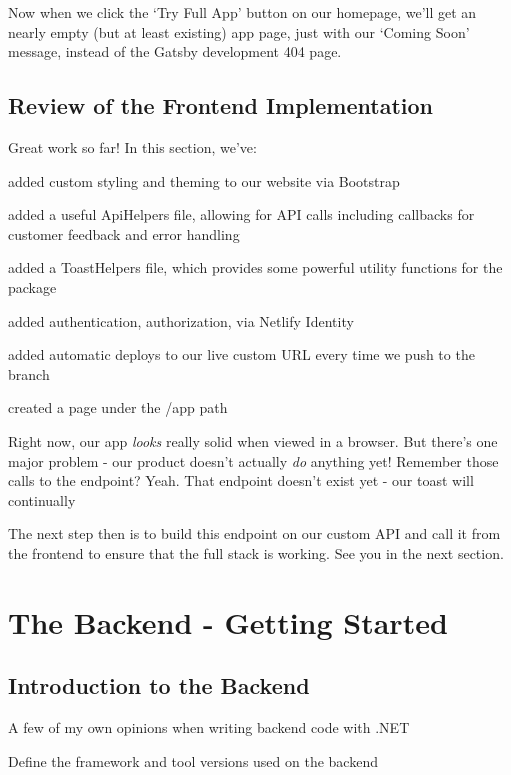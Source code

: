 \documentclass[paper=6in:9in,pagesize=pdftex,headinclude=on,footinclude=on,12pt]{scrbook}
\begin{document}
Now when we click the `Try Full App' button on our homepage, we'll get an nearly empty (but at least existing) app page, just with our `Coming Soon' message, instead of the Gatsby development 404 page.

\section{Review of the Frontend Implementation}

Great work so far! In this section, we've: 

\begin{arrows}
\item added custom styling and theming to our website via Bootstrap
\item added a useful ApiHelpers file, allowing for API calls including callbacks for customer feedback and error handling
\item added a ToastHelpers file, which provides some powerful utility functions for the  package
\item added authentication, authorization, via Netlify Identity
\item added automatic deploys to our live custom URL every time we push to the  branch
\item created a page under the /app path
\end{arrows}

Right now, our app \textit{looks} really solid when viewed in a browser. But there's one major problem - our product doesn't actually \textit{do} anything yet! \joy Remember those calls to the  endpoint? Yeah. That endpoint doesn't exist yet - our toast will continually 

The next step then is to build this  endpoint on our custom API and call it from the frontend to ensure that the full stack is working. See you in the next section.

\chapter{The Backend - Getting Started}

\section{Introduction to the Backend}
\begin{arrows}
\item A few of my own opinions when writing backend code with .NET
\item Define the framework and tool versions used on the backend
\end{arrows}
\end{document}
